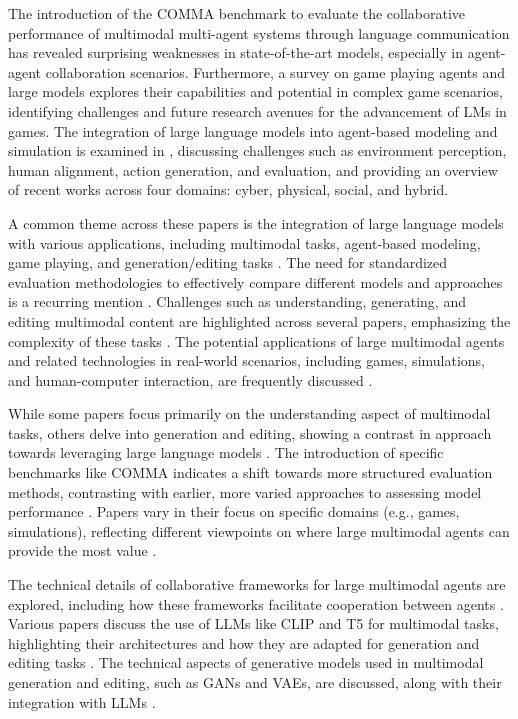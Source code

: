 \documentclass[conference]{IEEEtran}
\begin{document}
The introduction of the COMMA benchmark \cite{b2} to evaluate the collaborative performance of multimodal multi-agent systems through language communication has revealed surprising weaknesses in state-of-the-art models, especially in agent-agent collaboration scenarios. Furthermore, a survey on game playing agents and large models \cite{b3} explores their capabilities and potential in complex game scenarios, identifying challenges and future research avenues for the advancement of LMs in games. The integration of large language models into agent-based modeling and simulation is examined in \cite{b4}, discussing challenges such as environment perception, human alignment, action generation, and evaluation, and providing an overview of recent works across four domains: cyber, physical, social, and hybrid.

A common theme across these papers is the integration of large language models with various applications, including multimodal tasks, agent-based modeling, game playing, and generation/editing tasks \cite{b5}. The need for standardized evaluation methodologies to effectively compare different models and approaches is a recurring mention \cite{b6}. Challenges such as understanding, generating, and editing multimodal content are highlighted across several papers, emphasizing the complexity of these tasks \cite{b7}. The potential applications of large multimodal agents and related technologies in real-world scenarios, including games, simulations, and human-computer interaction, are frequently discussed \cite{b8}.

While some papers focus primarily on the understanding aspect of multimodal tasks, others delve into generation and editing, showing a contrast in approach towards leveraging large language models \cite{b9}. The introduction of specific benchmarks like COMMA indicates a shift towards more structured evaluation methods, contrasting with earlier, more varied approaches to assessing model performance \cite{b10}. Papers vary in their focus on specific domains (e.g., games, simulations), reflecting different viewpoints on where large multimodal agents can provide the most value \cite{b11}.

The technical details of collaborative frameworks for large multimodal agents are explored, including how these frameworks facilitate cooperation between agents \cite{b12}. Various papers discuss the use of LLMs like CLIP and T5 for multimodal tasks, highlighting their architectures and how they are adapted for generation and editing tasks \cite{b13}. The technical aspects of generative models used in multimodal generation and editing, such as GANs and VAEs, are discussed, along with their integration with LLMs \cite{b14}.
\end{document}
